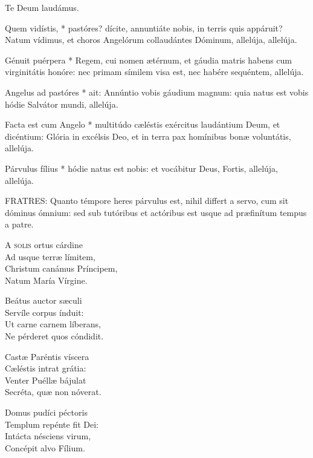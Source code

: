  Te Deum laudámus.



 Quem vidístis, * pastóres? dícite, annuntiáte nobis, in terris quis appáruit? Natum vídimus, et choros Angelórum collaudántes Dóminum, allelúja, allelúja.


 Génuit puérpera * Regem, cui nomen ætérnum, et gáudia matris habens cum virginitátis honóre: nec primam símilem visa est, nec habére sequéntem, allelúja.

 Angelus ad pastóres * ait: Annúntio vobis gáudium magnum: quia natus est vobis hódie Salvátor mundi, allelúja.

 Facta est cum Angelo * multitúdo cæléstis exércitus laudántium Deum, et dicéntium: Glória in excélsis Deo, et in terra pax homínibus bonæ voluntátis, allelúja.

 Párvulus fílius * hódie natus est nobis: et vocábitur Deus, Fortis, allelúja, allelúja.


\lettrine[lines=2]{F}{RATRES}: Quanto témpore heres párvulus est, nihil differt a servo, cum sit dóminus ómnium: sed sub tutóribus et actóribus est usque ad præfinítum tempus a patre.


\lettrine[lines=2]{A}{} \textsc{solis} ortus cárdine\\
Ad usque terræ límitem,\\
Christum canámus Príncipem,\\
Natum María Vírgine.

Beátus auctor sæculi\\
Servíle corpus índuit:\\
Ut carne carnem líberans,\\
Ne pérderet quos cóndidit.

Castæ Paréntis víscera\\
Cæléstis intrat grátia:\\
Venter Puéllæ bájulat\\
Secréta, quæ non nóverat.

Domus pudíci péctoris\\
Templum repénte fit Dei:\\
Intácta nésciens virum,\\
Concépit alvo Fílium.

